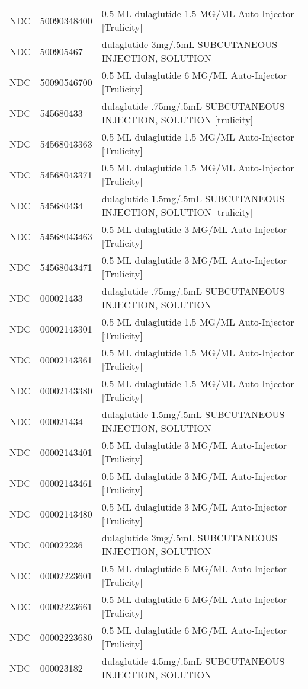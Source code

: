 \begin{longtable}{p{}p{}p{}}
  NDC & 50090348400 & 0.5 ML dulaglutide 1.5 MG/ML Auto-Injector [Trulicity] \\ 
  NDC & 500905467 & dulaglutide 3mg/.5mL SUBCUTANEOUS INJECTION, SOLUTION \\ 
  NDC & 50090546700 & 0.5 ML dulaglutide 6 MG/ML Auto-Injector [Trulicity] \\ 
  NDC & 545680433 & dulaglutide .75mg/.5mL SUBCUTANEOUS INJECTION, SOLUTION [trulicity] \\ 
  NDC & 54568043363 & 0.5 ML dulaglutide 1.5 MG/ML Auto-Injector [Trulicity] \\ 
  NDC & 54568043371 & 0.5 ML dulaglutide 1.5 MG/ML Auto-Injector [Trulicity] \\ 
  NDC & 545680434 & dulaglutide 1.5mg/.5mL SUBCUTANEOUS INJECTION, SOLUTION [trulicity] \\ 
  NDC & 54568043463 & 0.5 ML dulaglutide 3 MG/ML Auto-Injector [Trulicity] \\ 
  NDC & 54568043471 & 0.5 ML dulaglutide 3 MG/ML Auto-Injector [Trulicity] \\ 
  NDC & 000021433 & dulaglutide .75mg/.5mL SUBCUTANEOUS INJECTION, SOLUTION \\ 
  NDC & 00002143301 & 0.5 ML dulaglutide 1.5 MG/ML Auto-Injector [Trulicity] \\ 
  NDC & 00002143361 & 0.5 ML dulaglutide 1.5 MG/ML Auto-Injector [Trulicity] \\ 
  NDC & 00002143380 & 0.5 ML dulaglutide 1.5 MG/ML Auto-Injector [Trulicity] \\ 
  NDC & 000021434 & dulaglutide 1.5mg/.5mL SUBCUTANEOUS INJECTION, SOLUTION \\ 
  NDC & 00002143401 & 0.5 ML dulaglutide 3 MG/ML Auto-Injector [Trulicity] \\ 
  NDC & 00002143461 & 0.5 ML dulaglutide 3 MG/ML Auto-Injector [Trulicity] \\ 
  NDC & 00002143480 & 0.5 ML dulaglutide 3 MG/ML Auto-Injector [Trulicity] \\ 
  NDC & 000022236 & dulaglutide 3mg/.5mL SUBCUTANEOUS INJECTION, SOLUTION \\ 
  NDC & 00002223601 & 0.5 ML dulaglutide 6 MG/ML Auto-Injector [Trulicity] \\ 
  NDC & 00002223661 & 0.5 ML dulaglutide 6 MG/ML Auto-Injector [Trulicity] \\ 
  NDC & 00002223680 & 0.5 ML dulaglutide 6 MG/ML Auto-Injector [Trulicity] \\ 
  NDC & 000023182 & dulaglutide 4.5mg/.5mL SUBCUTANEOUS INJECTION, SOLUTION \\ 

\end{longtable}
